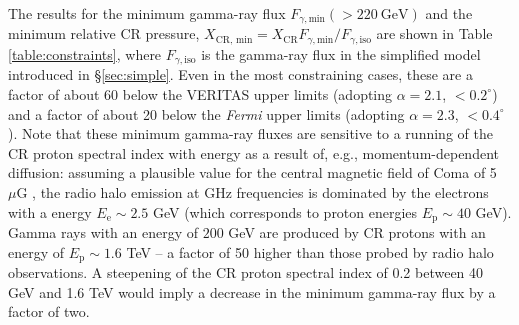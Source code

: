 \documentclass[12pt,manuscript]{aastex}
\newcommand{\rmn}{\mathrm}
\newcommand{\CR}{\mathrm{CR}}
\begin{document}
The results for the minimum gamma-ray flux $F_{\gamma,\rmn{min}}(>220~\rmn{GeV})$ and the minimum
relative CR pressure, $X_{\CR,\,\rmn{min}} = X_\CR F_{\gamma,\rmn{min}}/F_{\gamma,\rmn{iso}}$ are
shown in Table \ref{table:constraints}, where $F_{\gamma,\rmn{iso}}$ is the gamma-ray flux in the
simplified model introduced in \S\ref{sec:simple}. Even in the most constraining cases, these are a
factor of about 60 below the VERITAS upper limits (adopting $\alpha=2.1$, $<0.2^{\circ}$) and a
factor of about 20 below the {\em Fermi} upper limits (adopting $\alpha=2.3$, $<0.4^{\circ}$). Note
that these minimum gamma-ray fluxes are sensitive to a running of the CR proton spectral index with
energy as a result of, e.g., momentum-dependent diffusion: assuming a plausible value for the
central magnetic field of Coma of 5~$\mu$G \citep{article:Bonafede_etal:2010}, the radio halo
emission at GHz frequencies is dominated by the electrons with a energy $E_\rmn{e} \sim 2.5$ GeV
(which corresponds to proton energies $E_\rmn{p} \sim 40$ GeV). Gamma rays with an energy of $200$
GeV are produced by CR protons with an energy of $E_\rmn{p} \sim 1.6$ TeV -- a factor of 50 higher
than those probed by radio halo observations. A steepening of the CR proton spectral index of 0.2
between 40 GeV and 1.6 TeV would imply a decrease in the minimum gamma-ray flux by a factor of two.

%
%
 
\end{document}
